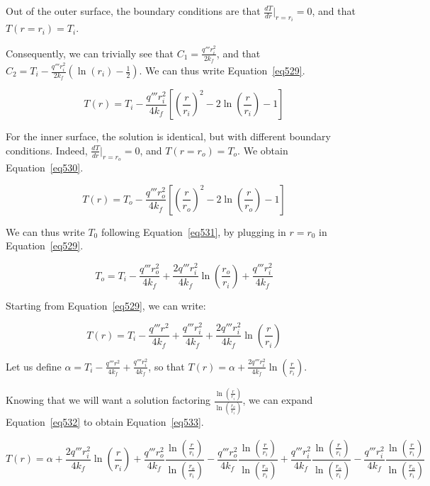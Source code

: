 Out of the outer surface, the boundary conditions are that $\frac{dT}{dr}\bigg\rvert_{r=r_i} = 0$, and that $T(r=r_i) = T_i$.

Consequently, we can trivially see that $C_1 = \frac{q'''r_i^2}{2k_f}$, and that $C_2 = T_i - \frac{q'''r_i^2}{2k_f}\left( \ln(r_i) - \frac{1}{2}\right)$. We can thus write Equation~\ref{eq529}.


\begin{equation}\label{eq529}
T(r) = T_i - \frac{q'''r_i^2}{4k_f}\left[ \left( \frac{r}{r_i} \right)^2 - 2\ln\left( \frac{r}{r_i} \right) - 1 \right]
\end{equation}

For the inner surface, the solution is identical, but with different boundary conditions. Indeed, $\frac{dT}{dr}\bigg\rvert_{r=r_o} = 0$, and $T(r=r_o) = T_o$. We obtain Equation~\ref{eq530}.


\begin{equation}\label{eq530}
T(r) = T_o - \frac{q'''r_o^2}{4k_f}\left[ \left( \frac{r}{r_o} \right)^2 - 2\ln \left( \frac{r}{r_o} \right) - 1 \right]
\end{equation}

We can thus write $T_0$ following Equation~\ref{eq531}, by plugging in $r=r_0$ in Equation~\ref{eq529}.


\begin{equation}\label{eq531}
T_o = T_i - \frac{q'''r_o^2}{4k_f} + \frac{2q'''r_i^2}{4k_f}\ln \left( \frac{r_o}{r_i} \right) + \frac{q'''r_i^2}{4k_f}
\end{equation}

Starting from Equation~\ref{eq529}, we can write:


\begin{equation}\label{eq532}
T(r) = T_i - \frac{q'''r^2}{4k_f} + \frac{q'''r_i^2}{4k_f} + \frac{2q'''r_i^2}{4k_f}\ln\left( \frac{r}{r_i} \right)
\end{equation}

Let us define $\alpha = T_i - \frac{q'''r^2}{4k_f} + \frac{q'''r_i^2}{4k_f}$, so that $T(r) = \alpha + \frac{2q'''r_i^2}{4k_f}\ln\left( \frac{r}{r_i} \right)$.

Knowing that we will want a solution factoring $\frac{\ln\left( \frac{r}{r_i} \right)}{\ln \left( \frac{r_o}{r_i} \right)}$, we can expand Equation~\ref{eq532} to obtain Equation~\ref{eq533}.

\begin{equation}\label{eq533}
T(r) = \alpha + \frac{2q'''r_i^2}{4k_f}\ln\left( \frac{r}{r_i} \right) + \frac{q'''r_o^2}{4k_f}\frac{\ln\left( \frac{r}{r_i} \right)}{\ln \left( \frac{r_o}{r_i} \right)} - \frac{q'''r_o^2}{4k_f}\frac{\ln\left( \frac{r}{r_i} \right)}{\ln \left( \frac{r_o}{r_i} \right)} + \frac{q'''r_i^2}{4k_f}\frac{\ln\left( \frac{r}{r_i} \right)}{\ln \left( \frac{r_o}{r_i} \right)} - \frac{q'''r_i^2}{4k_f}\frac{\ln\left( \frac{r}{r_i} \right)}{\ln \left( \frac{r_o}{r_i} \right)}
\end{equation}


